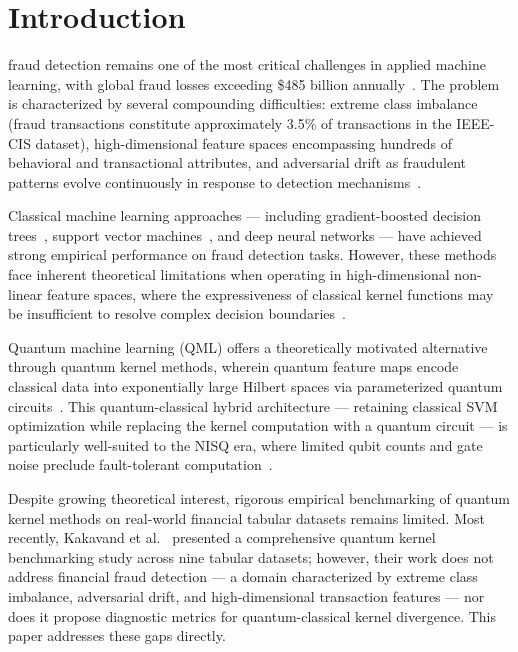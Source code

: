 \documentclass[journal]{IEEEtran}
\begin{document}
\section{Introduction}

 fraud detection remains one of the most 
critical challenges in applied machine learning, with global fraud 
losses exceeding \$485 billion annually~\cite{nilson2023}. 
The problem is characterized by several compounding difficulties: 
extreme class imbalance (fraud transactions constitute approximately 
3.5\% of transactions in the IEEE-CIS dataset), high-dimensional 
feature spaces encompassing hundreds of behavioral and transactional 
attributes, and adversarial drift as fraudulent patterns evolve 
continuously in response to detection mechanisms~\cite{dalpozzolo2015}.

Classical machine learning approaches --- including gradient-boosted 
decision trees~\cite{chen2016xgboost}, support vector 
machines~\cite{cortes1995}, and deep neural networks --- 
have achieved strong empirical performance on fraud detection tasks. 
However, these methods face inherent theoretical limitations when 
operating in high-dimensional non-linear feature spaces, where 
the expressiveness of classical kernel functions may be insufficient 
to resolve complex decision boundaries~\cite{scholkopf2002}.

Quantum machine learning (QML) offers a theoretically motivated 
alternative through quantum kernel methods, wherein quantum feature 
maps encode classical data into exponentially large Hilbert spaces 
via parameterized quantum circuits~\cite{havlicek2019}. This 
quantum-classical hybrid architecture --- retaining classical SVM 
optimization while replacing the kernel computation with a quantum 
circuit --- is particularly well-suited to the NISQ era, where 
limited qubit counts and gate noise preclude fault-tolerant 
computation~\cite{preskill2018}.

Despite growing theoretical interest, rigorous empirical benchmarking 
of quantum kernel methods on real-world financial tabular datasets 
remains limited. Most recently, Kakavand et al.~\cite{kakavand2026} 
presented a comprehensive quantum kernel benchmarking study across 
nine tabular datasets; however, their work does not address financial 
fraud detection --- a domain characterized by extreme class imbalance, 
adversarial drift, and high-dimensional transaction features --- nor 
does it propose diagnostic metrics for quantum-classical kernel 
divergence. This paper addresses these gaps directly.
\end{document}
